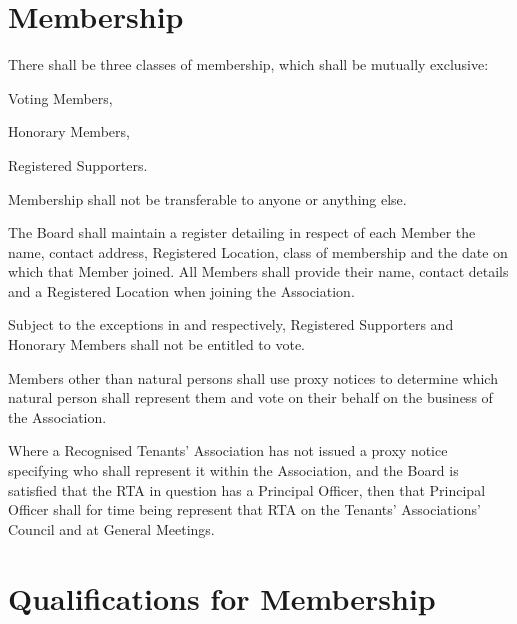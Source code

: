 \documentclass[10pt]{mk-articles-of-association}
\newcommand{\EC}[0]{Board}
\newcommand{\Exec}[0]{\EC{} }
\newcommand{\RTA}[0]{Recognised Tenants' Association}
\begin{document}
\section{Membership}
  \begin{constenum}

  \item There shall be three classes of membership, which shall be mutually
    exclusive:
    \begin{constenum}
      \item Voting Members,
      \item Honorary Members, \ITand
      \item Registered Supporters.
    \end{constenum}

  \item Membership shall not be transferable to anyone or anything else.

  \item The \Exec shall maintain a register detailing in respect of
    each Member the name, contact address, Registered Location,
    class of membership and the date on which that Member joined.
    All Members shall provide their name, contact details and a Registered
    Location when joining the Association.

  \item Subject to the exceptions in  and
     respectively, Registered Supporters and
    Honorary Members shall not be entitled to vote.

  \item Members other than natural persons shall use proxy notices to
    determine which natural person shall represent them and vote on
    their behalf on the business of the Association.

  \item Where a \RTA{} has not issued a proxy notice specifying who
    shall represent it within the Association, and the \Exec is
    satisfied that the RTA in question has a Principal Officer, then
    that Principal Officer shall for time being represent that RTA on
    the Tenants' Associations' Council and at General Meetings.

\end{constenum}


\section{Qualifications for Membership}
\end{document}
